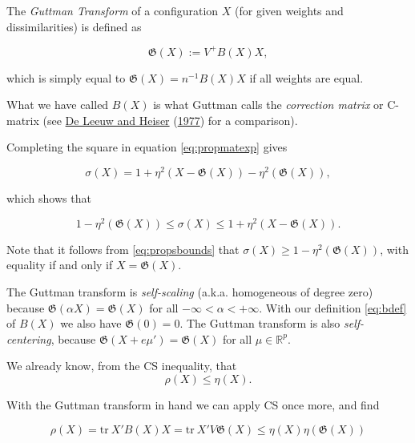 \documentclass[
  12pt,
]{book}
\theoremstyle{definition}
\theoremstyle{definition}
\theoremstyle{definition}
\theoremstyle{definition}
\theoremstyle{remark}
\begin{document}
The \emph{Guttman Transform} of a configuration \(X\) (for given weights and dissimilarities) is defined as

\begin{equation}
\mathfrak{G}(X):=V^+B(X)X,
\label{eq:guttrans}
\end{equation}

which is simply equal to \(\mathfrak{G}(X)=n^{-1}B(X)X\) if all weights are equal.

What we have called \(B(X)\) is what Guttman calls the \emph{correction matrix} or C-matrix (see \protect\hyperlink{ref-deleeuw_heiser_C_77}{De Leeuw and Heiser} (\protect\hyperlink{ref-deleeuw_heiser_C_77}{1977}) for a comparison).

Completing the square in equation \eqref{eq:propmatexp} gives

\begin{equation}
\sigma(X)=1+\eta^2(X-\mathfrak{G}(X))-\eta^2(\mathfrak{G}(X)),
\label{eq:gutsquare}
\end{equation}

which shows that

\begin{equation}
1-\eta^2(\mathfrak{G}(X))\leq\sigma(X)\leq 1+\eta^2(X-\mathfrak{G}(X)).
\label{eq:propsbounds}
\end{equation}

Note that it follows from \eqref{eq:propsbounds} that \(\sigma(X)\geq 1-\eta^2(\mathfrak{G}(X))\), with equality if and only if \(X=\mathfrak{G}(X)\).

The Guttman transform is \emph{self-scaling} (a.k.a. homogeneous of degree zero) because \(\mathfrak{G}(\alpha X)=\mathfrak{G}(X)\)
for all \(-\infty<\alpha<+\infty\). With our definition \eqref{eq:bdef} of \(B(X)\) we also have \(\mathfrak{G}(0)=0\). The Guttman transform is also \emph{self-centering}, because \(\mathfrak{G}(X+e\mu')=\mathfrak{G}(X)\) for all \(\mu\in\mathbb{R}^p\).

We already know, from the CS inequality, that
\begin{equation}
\rho(X)\leq\eta(X).
\label{eq:csagain}
\end{equation}

With the Guttman transform in hand we can apply CS once more, and find

\begin{equation}
\rho(X)=\text{tr}\ X'B(X)X=\text{tr}\ X'V\mathfrak{G}(X)\leq\eta(X)\eta(\mathfrak{G}(X))
\label{eq:csagainagain}
\end{equation}
\end{document}
